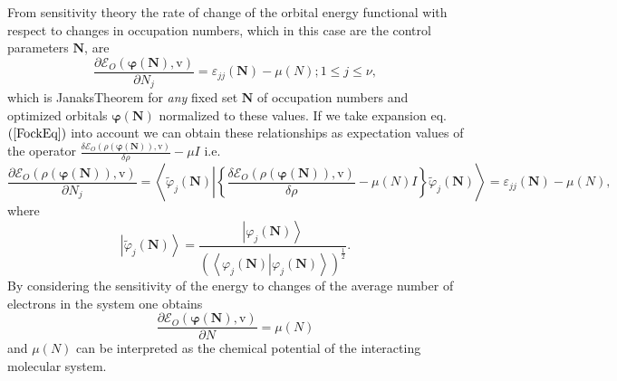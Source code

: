 \documentclass[aps,preprint]{revtex4}%
\begin{document}
From sensitivity theory the rate of change of the orbital energy functional
with respect to changes in occupation numbers, which in this case are the
control parameters $\boldsymbol{N}$, are
\begin{equation}
\frac{\partial\mathcal{E}_{O}\left(  \boldsymbol{\varphi\left(  \boldsymbol{N}%
\right)  },\mathrm{v}\right)  }{\partial N_{j}}=\varepsilon_{jj}\left(
\boldsymbol{N}\right)  -\mu\left(  N\right)  ;1\leq j\leq\nu, \label{Janak}%
\end{equation}
which is JanaksTheorem for \emph{any }fixed set $\boldsymbol{\boldsymbol{N}}$
of occupation numbers and optimized orbitals $\boldsymbol{\varphi\left(
\boldsymbol{N}\right)  }$ normalized to these values. If we take expansion eq.
$\left(  \ref{FockEq}\right)  $ into account we can obtain these relationships
as expectation values of the operator $\frac{\delta\mathcal{E}_{O}\left(
\rho\left(  \boldsymbol{\varphi\left(  \boldsymbol{N}\right)  }\right)
\boldsymbol{,}\mathrm{v}\right)  }{\delta\rho}-\mu I$ i.e.
\begin{equation}
\frac{\partial\mathcal{E}_{O}\left(  \rho\left(  \boldsymbol{\varphi\left(
\boldsymbol{N}\right)  }\right)  ,\mathrm{v}\right)  }{\partial N_{j}%
}=\left\langle \tilde{\varphi}_{j}\left(  \boldsymbol{N}\right)  \left\vert
\left\{  \frac{\delta\mathcal{E}_{O}\left(  \rho\left(  \boldsymbol{\varphi
\left(  \boldsymbol{N}\right)  }\right)  \boldsymbol{,}\mathrm{v}\right)
}{\delta\rho}-\mu\left(  N\right)  I\right\}  \right.  \tilde{\varphi}%
_{j}\left(  \boldsymbol{N}\right)  \right\rangle =\varepsilon_{jj}\left(
\boldsymbol{N}\right)  -\mu\left(  N\right)  ,
\end{equation}
where
\begin{equation}
\left\vert \tilde{\varphi}_{j}\left(  \boldsymbol{N}\right)  \right\rangle
=\frac{\left\vert \varphi_{j}\left(  \boldsymbol{N}\right)  \right\rangle
}{\left(  \left\langle \left.  \varphi_{j}\left(  \boldsymbol{N}\right)
\right\vert \varphi_{j}\left(  \boldsymbol{N}\right)  \right\rangle \right)
^{\frac{1}{2}}}.
\end{equation}
By considering the sensitivity of the energy to changes of the average number
of electrons in the system one obtains
\begin{equation}
\frac{\partial\mathcal{E}_{O}\left(  \boldsymbol{\varphi}\left(
\boldsymbol{N}\right)  \boldsymbol{,}\mathrm{v}\right)  }{\partial N}%
=\mu\left(  N\right)
\end{equation}
and $\mu\left(  N\right)  $ can be interpreted as the chemical potential of
the interacting molecular system.
\end{document}
